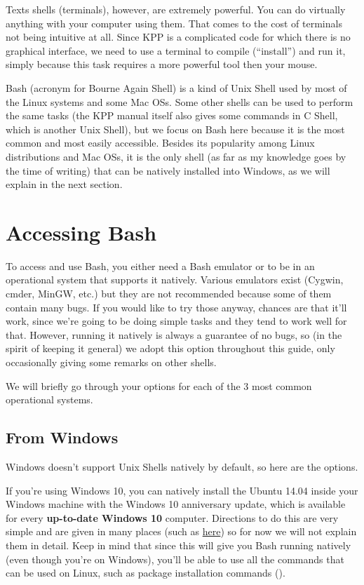 \documentclass[letterpaper,10pt,openany,oneside]{sphinxmanual}
\begin{document}
Texts shells (terminals), however, are extremely powerful. You can do virtually
anything with your computer using them. That comes to the cost of terminals not
being intuitive at all. Since KPP is a complicated code for which there is no
graphical interface, we need to use a terminal to compile (``install'') and run
it, simply because this task requires a more powerful tool then your mouse.

Bash (acronym for Bourne Again Shell) is a kind of Unix Shell used by most of
the Linux systems and some Mac OSs. Some other shells can be used to perform
the same tasks (the KPP manual itself also gives some commands in C Shell,
which is another Unix Shell), but we focus on Bash here because it is the most
common and most easily accessible. Besides its popularity among Linux
distributions and Mac OSs, it is the only shell (as far as my knowledge goes by
the time of writing) that can be natively installed into Windows, as we will
explain in the next section.


\section{Accessing Bash}
\label{bash:accessing-bash}
To access and use Bash, you either need a Bash emulator or to be in an
operational system that supports it natively. Various emulators exist (Cygwin,
cmder, MinGW, etc.) but they are not recommended because some of them contain
many bugs. If you would like to try those anyway, chances are that it'll work,
since we're going to be doing simple tasks and they tend to work well for that.
However, running it natively is always a guarantee of no bugs, so (in the
spirit of keeping it general) we adopt this option throughout this guide, only
occasionally giving some remarks on other shells.

We will briefly go through your options for each of the 3 most common
operational systems.


\subsection{From Windows}
\label{bash:from-windows}
Windows doesn't support Unix Shells natively by default, so here are the
options.

If you're using Windows 10, you can natively install the Ubuntu 14.04 inside
your Windows machine with the Windows 10 anniversary update, which is available
for every \textbf{up-to-date Windows 10} computer. Directions to do this are very
simple and are given in many places (such as \href{http://www.howtogeek.com/249966/how-to-install-and-use-the-linux-bash-shell-on-windows-10/}{here})
so for now we will not explain them in detail. Keep in mind that since this
will give you Bash running natively (even though you're on Windows), you'll be
able to use all the commands that can be used on Linux, such as package
installation commands ().
\end{document}
